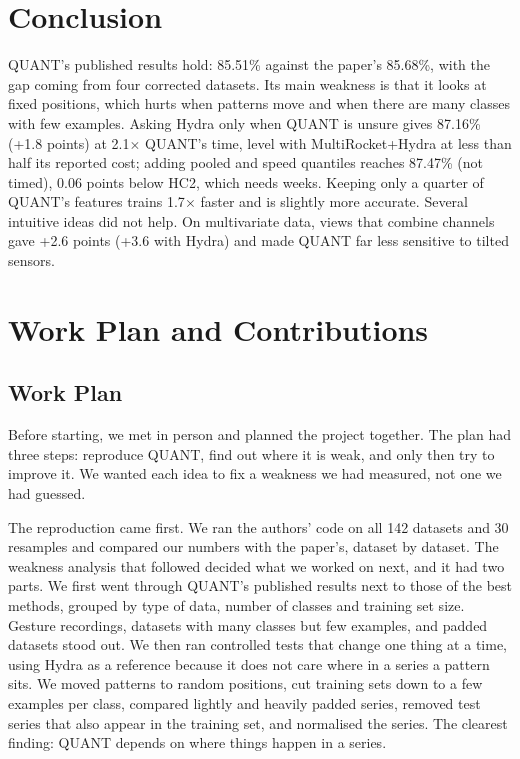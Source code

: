 \documentclass[conference]{IEEEtran}
\begin{document}
\section{Conclusion}
QUANT's published results hold: 85.51\% against the paper's 85.68\%, with the gap coming from four corrected datasets. Its main weakness is that it looks at fixed positions, which hurts when patterns move and when there are many classes with few examples. Asking Hydra only when QUANT is unsure gives 87.16\% (+1.8 points) at 2.1$\times$ QUANT's time, level with MultiRocket+Hydra at less than half its reported cost; adding pooled and speed quantiles reaches 87.47\% (not timed), 0.06 points below HC2, which needs weeks. Keeping only a quarter of QUANT's features trains 1.7$\times$ faster and is slightly more accurate. Several intuitive ideas did not help. On multivariate data, views that combine channels gave +2.6 points (+3.6 with Hydra) and made QUANT far less sensitive to tilted sensors.

\clearpage
\raggedbottom
\section*{Work Plan and Contributions}

\subsection*{Work Plan}
Before starting, we met in person and planned the project together. The plan had three steps: reproduce QUANT, find out where it is weak, and only then try to improve it. We wanted each idea to fix a weakness we had measured, not one we had guessed.

The reproduction came first. We ran the authors' code on all 142 datasets and 30 resamples and compared our numbers with the paper's, dataset by dataset. The weakness analysis that followed decided what we worked on next, and it had two parts. We first went through QUANT's published results next to those of the best methods, grouped by type of data, number of classes and training set size. Gesture recordings, datasets with many classes but few examples, and padded datasets stood out. We then ran controlled tests that change one thing at a time, using Hydra as a reference because it does not care where in a series a pattern sits. We moved patterns to random positions, cut training sets down to a few examples per class, compared lightly and heavily padded series, removed test series that also appear in the training set, and normalised the series. The clearest finding: QUANT depends on where things happen in a series.
\end{document}
